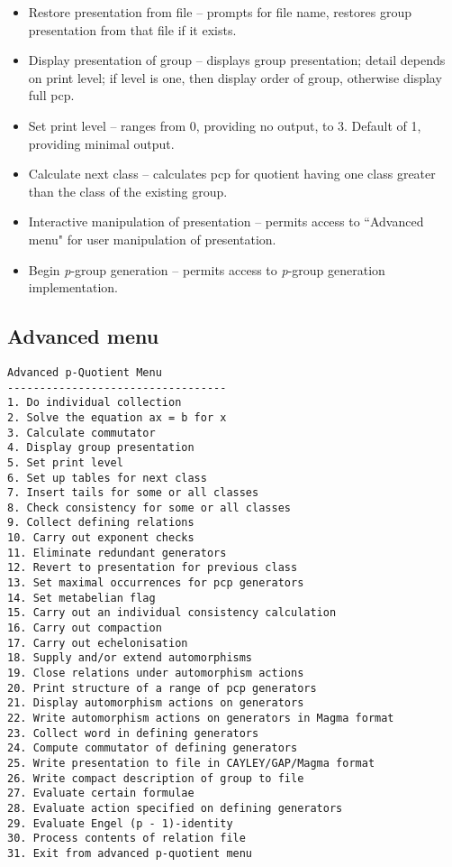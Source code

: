 \begin{itemize}
\item Restore presentation from file -- prompts for file name,
restores group presentation from that file if it exists.

\item Display presentation of group -- displays group presentation;
detail depends on print level; if level is one, then display order
of group, otherwise display full pcp.

\item Set print level -- ranges from 0, providing no output, to 3. 
Default of 1, providing minimal output. 

\item Calculate next class -- calculates pcp for quotient
having one class greater than the class of the existing group.

\item Interactive manipulation of presentation -- 
permits access to ``Advanced menu" for user manipulation of
presentation.

\item Begin {\it p}-group generation -- permits access to 
{\it p}-group generation implementation.
\end{itemize}

\subsection{Advanced menu}

\begin{verbatim}
Advanced p-Quotient Menu
----------------------------------
1. Do individual collection
2. Solve the equation ax = b for x
3. Calculate commutator
4. Display group presentation
5. Set print level
6. Set up tables for next class
7. Insert tails for some or all classes
8. Check consistency for some or all classes
9. Collect defining relations
10. Carry out exponent checks
11. Eliminate redundant generators
12. Revert to presentation for previous class
13. Set maximal occurrences for pcp generators
14. Set metabelian flag
15. Carry out an individual consistency calculation
16. Carry out compaction
17. Carry out echelonisation
18. Supply and/or extend automorphisms
19. Close relations under automorphism actions
20. Print structure of a range of pcp generators
21. Display automorphism actions on generators
22. Write automorphism actions on generators in Magma format
23. Collect word in defining generators
24. Compute commutator of defining generators
25. Write presentation to file in CAYLEY/GAP/Magma format
26. Write compact description of group to file
27. Evaluate certain formulae
28. Evaluate action specified on defining generators
29. Evaluate Engel (p - 1)-identity
30. Process contents of relation file
31. Exit from advanced p-quotient menu
\end{verbatim}

